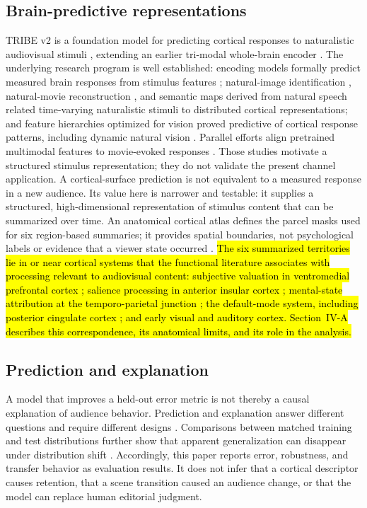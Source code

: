 \documentclass{ieeeaccess}
\newcommand{\rev}[1]{\hl{#1}}
\newcommand{\rev}[1]{#1}
\begin{document}
\subsection{Brain-predictive representations}
TRIBE v2 is a foundation model for predicting cortical responses to naturalistic audiovisual stimuli \cite{dascoli2026tribev2}, extending an earlier tri-modal whole-brain encoder \cite{dascoli2025tribe}. The underlying research program is well established: encoding models formally predict measured brain responses from stimulus features \cite{naselaris2011encoding}; natural-image identification \cite{kay2008identifying}, natural-movie reconstruction \cite{nishimoto2011naturalmovies}, and semantic maps derived from natural speech \cite{huth2016naturalspeech} related time-varying naturalistic stimuli to distributed cortical representations; and feature hierarchies optimized for vision proved predictive of cortical response patterns, including dynamic natural vision \cite{yamins2014performance,wen2018neural}. Parallel efforts align pretrained multimodal features to movie-evoked responses \cite{villanueva2025predicting}. Those studies motivate a structured stimulus representation; they do not validate the present channel application. A cortical-surface prediction is not equivalent to a measured response in a new audience. Its value here is narrower and testable: it supplies a structured, high-dimensional representation of stimulus content that can be summarized over time. An anatomical cortical atlas defines the parcel masks used for six region-based summaries; it provides spatial boundaries, not psychological labels or evidence that a viewer state occurred \cite{destrieux2010parcellation}. \rev{The six summarized territories lie in or near cortical systems that the functional literature associates with processing relevant to audiovisual content: subjective valuation in ventromedial prefrontal cortex \mbox{\cite{bartra2013valuation}}; salience processing in anterior insular cortex \mbox{\cite{seeley2007salience}}; mental-state attribution at the temporo-parietal junction \mbox{\cite{saxe2003people}}; the default-mode system, including posterior cingulate cortex \mbox{\cite{raichle2001default}}; and early visual \mbox{\cite{wandell2007visual}} and auditory \mbox{\cite{griffiths2002planum}} cortex. \mbox{Section~IV-A} describes this correspondence, its anatomical limits, and its role in the analysis.}

\subsection{Prediction and explanation}
A model that improves a held-out error metric is not thereby a causal explanation of audience behavior. Prediction and explanation answer different questions and require different designs \cite{yarkoni2017prediction,shmueli2010explain}. Comparisons between matched training and test distributions further show that apparent generalization can disappear under distribution shift \cite{recht2019imagenet}. Accordingly, this paper reports error, robustness, and transfer behavior as evaluation results. It does not infer that a cortical descriptor causes retention, that a scene transition caused an audience change, or that the model can replace human editorial judgment.
\end{document}
